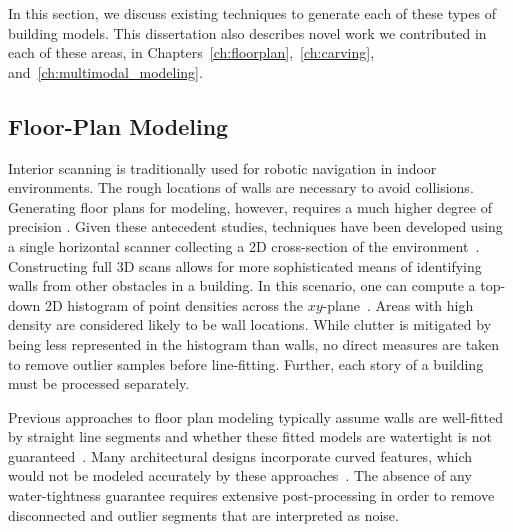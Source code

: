 \documentclass[12pt,onecolumn,oneside]{book}
\begin{document}
In this section, we discuss existing techniques to generate each of these types of building models.  This dissertation also describes novel work we contributed in each of these areas, in Chapters~\ref{ch:floorplan},~\ref{ch:carving}, and~\ref{ch:multimodal_modeling}.

\subsection{Floor-Plan Modeling}
\label{ssec:background_floorplan}

Interior scanning is traditionally used for robotic navigation in indoor environments.  The rough locations of walls are necessary to avoid collisions.  Generating floor plans for modeling, however, requires a much higher degree of precision \cite{Okorn09}.  Given these antecedent studies, techniques have been developed using a single horizontal scanner collecting a 2D cross-section of the environment~\cite{Weiss05}.  Constructing full 3D scans allows for more sophisticated means of identifying walls from other obstacles in a building.  In this scenario, one can compute a top-down 2D histogram of point densities across the $xy$-plane~\cite{Okorn09}.  Areas with high density are considered likely to be wall locations.  While clutter is mitigated by being less represented in the histogram than walls, no direct measures are taken to remove outlier samples before line-fitting.  Further, each story of a building must be processed separately.

Previous approaches to floor plan modeling typically assume walls are well-fitted by straight line segments and whether these fitted models are watertight is not guaranteed~\cite{Nuchter03, Okorn09, Weiss05}.  Many architectural designs incorporate curved features, which would not be modeled accurately by these approaches~\cite{Castles07,Turner12}. The absence of any water-tightness guarantee requires extensive post-processing in order to remove disconnected and outlier segments that are interpreted as noise.
\end{document}
